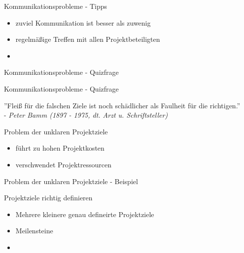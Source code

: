 \documentclass[12pt]{beamer}
\begin{document}
	\begin{frame}{Kommunikationsprobleme - Tipps}
		\begin{itemize}
			\item{zuviel Kommunikation ist besser als zuwenig}
			\item{regelmäßige Treffen mit allen Projektbeteiligten}
			\item{}
		\end{itemize}
	
	\end{frame}

	\begin{frame}{Kommunikationsprobleme - Quizfrage}
	
	\end{frame}

	\begin{frame}{Kommunikationsprobleme - Quizfrage}
			
	\end{frame}

	\thispagestyle{empty}
	\begin{frame}
		''Fleiß für die falschen Ziele ist noch schädlicher als Faulheit für die richtigen.'' \\
		- \textit{Peter Bamm (1897 - 1975, dt. Arzt u. Schriftsteller)}
	\end{frame}

	
	\begin{frame}{Problem der unklaren Projektziele }
		\begin{itemize}
			\item{führt zu hohen Projektkosten}
			\item{verschwendet Projektressourcen}
		\end{itemize}

	\end{frame}

	\begin{frame}{Problem der unklaren Projektziele - Beispiel}
		

		
	\end{frame}

	\begin{frame}{Projektziele richtig definieren}
		\begin{itemize}
			\item{Mehrere kleinere genau defineirte Projektziele}
			\item{Meilensteine}
			\item{}
		\end{itemize}
	\end{frame}
\end{document}

